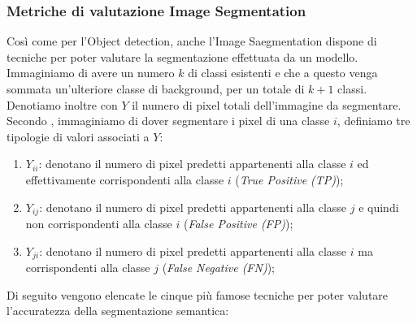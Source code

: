 \subsubsection{Metriche di valutazione Image Segmentation}
Così come per l'Object detection, anche l'Image Saegmentation dispone di tecniche 
per poter valutare la segmentazione effettuata da un modello. Immaginiamo di 
avere un numero $k$ di classi esistenti e che a questo venga sommata un'ulteriore 
classe di background, per un totale di $k+1$ classi. Denotiamo inoltre con $Y$ il 
numero di pixel totali dell'immagine da segmentare. Secondo \cite{metric_semantic_seg}, immaginiamo di dover segmentare i pixel di una classe $i$, definiamo tre 
tipologie di valori associati a $Y$:
\begin{enumerate}
    \item $Y_{ii}$: denotano il numero di pixel predetti appartenenti alla classe $i$ ed 
    effettivamente corrispondenti alla classe $i$ (\emph{True Positive (TP)});
    \item $Y_{ij}$: denotano il numero di pixel predetti appartenenti alla classe $j$ e quindi 
    non corrispondenti alla classe $i$ (\emph{False Positive (FP)});
    \item $Y_{ji}$: denotano il numero di pixel predetti appartenenti alla classe $i$ ma 
    corrispondenti alla classe $j$ (\emph{False Negative (FN)});
\end{enumerate}
Di seguito vengono elencate le cinque più famose tecniche per poter valutare 
l'accuratezza della segmentazione semantica:
